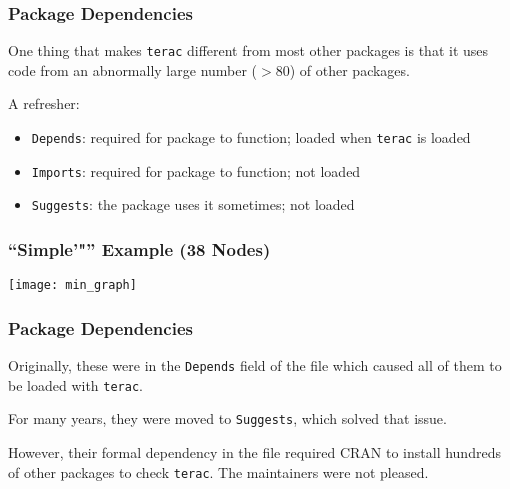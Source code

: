 \documentclass[12 pt]{beamer}\usepackage[]{graphicx}\usepackage[]{color}
\newcommand{\pkg}[1]{{\fontseries{b}\selectfont #1}}
\renewcommand{\pkg}[1]{{\color{darkgreen}\texttt{#1}}}
\begin{document}

  \begin{frame}[fragile]
\frametitle{Package Dependencies}



One thing that makes \pkg{terac} different from most other packages is that it uses code from an abnormally large number ($> 80$) of other packages.

\vspace{.1in}

A refresher:

\begin{itemize}
\item \texttt{Depends}: required for package to function; loaded when \pkg{terac} is loaded
\item \texttt{Imports}: required for package to function; not loaded
\item \texttt{Suggests}: the package uses it sometimes; not loaded
\end{itemize}

\end{frame}



\begin{frame}[fragile]
\frametitle{``Simple'"'' Example (38 Nodes)}
\vspace{-.5in}
  \begin{center}
    \texttt{[image: min\_graph]}
  \end{center}
\end{frame}




\begin{frame}[fragile]
\frametitle{Package Dependencies}


Originally, these were in the \texttt{Depends} field of the  file which caused all of them to be loaded with \pkg{terac}.

\vspace{.15in}

For many years, they were moved to \texttt{Suggests}, which solved that issue.


\vspace{.15in}

However, their formal dependency in the  file required CRAN  to install hundreds of other packages to check  \pkg{terac}. The maintainers were not pleased.

\end{frame}
\end{document}
